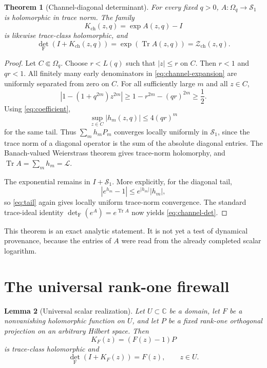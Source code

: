 \documentclass[11pt]{article}
\newtheorem{theorem}{Theorem}[section]
\newtheorem{lemma}[theorem]{Lemma}
\newcommand{\Zch}{\mathcal Z_{\mathrm{ch}}}
\newcommand{\Sch}{\mathcal S_1}
\newcommand{\Fdet}{\det_{\mathrm F}}
\begin{document}
\begin{theorem}[Channel-diagonal determinant]\label{thm:channel}
For every fixed $q>0$, $A:\Omega_q\to\Sch$ is holomorphic in trace norm.
The family
\[
 K_{\mathrm{ch}}(z,q)=\exp A(z,q)-I
\]
is likewise trace-class holomorphic, and
\begin{equation}\label{eq:channel-det}
 \Fdet(I+K_{\mathrm{ch}}(z,q))
 =\exp(\operatorname{Tr}A(z,q))
 =\Zch(z,q).
\end{equation}
\end{theorem}

\begin{proof}
Let $C\Subset\Omega_q$.  Choose $r<L(q)$ such that $|z|\leq r$ on $C$.
Then $r<1$ and $qr<1$.  All finitely many early denominators in
\eqref{eq:channel-expansion} are uniformly separated from zero on $C$.
For all sufficiently large $m$ and all $z\in C$,
\[
 \left|1-(1+q^{2m})z^{2m}\right|
 \geq1-r^{2m}-(qr)^{2m}\geq\frac12.
\]
Using \eqref{eq:coefficient},
\begin{equation}\label{eq:tail}
 \sup_{z\in C}|h_m(z,q)|\leq4(qr)^m
\end{equation}
for the same tail.  Thus $\sum_m h_mP_m$ converges locally uniformly in
$\Sch$, since the trace norm of a diagonal operator is the sum of the
absolute diagonal entries.  The Banach-valued Weierstrass theorem gives
trace-norm holomorphy, and
$\operatorname{Tr}A=\sum_mh_m=\mathcal L$.

The exponential remains in $I+\Sch$.  More explicitly, for the diagonal
tail,
\[
 |e^{h_m}-1|\leq e^{|h_m|}|h_m|,
\]
so \eqref{eq:tail} again gives locally uniform trace-norm convergence.
The standard trace-ideal identity
$\Fdet(e^A)=e^{\operatorname{Tr}A}$ \cite{Simon2005} now yields
\eqref{eq:channel-det}.
\end{proof}

This theorem is an exact analytic statement.  It is not yet a test of
dynamical provenance, because the entries of $A$ were read from the already
completed scalar logarithm.

\section{The universal rank-one firewall}

\begin{lemma}[Universal scalar realization]\label{lem:rankone}
Let $U\subset\mathbb C$ be a domain, let $F$ be a nonvanishing holomorphic
function on $U$, and let $P$ be a fixed rank-one orthogonal projection on an
arbitrary Hilbert space.  Then
\[
 K_F(z)=(F(z)-1)P
\]
is trace-class holomorphic and
\begin{equation}\label{eq:rankone}
 \Fdet(I+K_F(z))=F(z),\qquad z\in U.
\end{equation}
\end{lemma}
\end{document}
